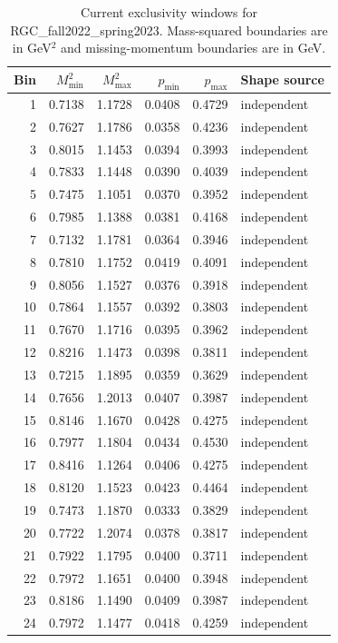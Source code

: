 \clearpage
\begin{longtable}{rrrrrl}
\caption{Current exclusivity windows for RGC\_fall2022\_spring2023. Mass-squared boundaries are in GeV$^2$ and missing-momentum boundaries are in GeV.}\\
\toprule Bin & $M^2_{\min}$ & $M^2_{\max}$ & $p_{\min}$ & $p_{\max}$ & Shape source\\\midrule\endhead
1 & 0.7138 & 1.1728 & 0.0408 & 0.4729 & independent\\
2 & 0.7627 & 1.1786 & 0.0358 & 0.4236 & independent\\
3 & 0.8015 & 1.1453 & 0.0394 & 0.3993 & independent\\
4 & 0.7833 & 1.1448 & 0.0390 & 0.4039 & independent\\
5 & 0.7475 & 1.1051 & 0.0370 & 0.3952 & independent\\
6 & 0.7985 & 1.1388 & 0.0381 & 0.4168 & independent\\
7 & 0.7132 & 1.1781 & 0.0364 & 0.3946 & independent\\
8 & 0.7810 & 1.1752 & 0.0419 & 0.4091 & independent\\
9 & 0.8056 & 1.1527 & 0.0376 & 0.3918 & independent\\
10 & 0.7864 & 1.1557 & 0.0392 & 0.3803 & independent\\
11 & 0.7670 & 1.1716 & 0.0395 & 0.3962 & independent\\
12 & 0.8216 & 1.1473 & 0.0398 & 0.3811 & independent\\
13 & 0.7215 & 1.1895 & 0.0359 & 0.3629 & independent\\
14 & 0.7656 & 1.2013 & 0.0407 & 0.3987 & independent\\
15 & 0.8146 & 1.1670 & 0.0428 & 0.4275 & independent\\
16 & 0.7977 & 1.1804 & 0.0434 & 0.4530 & independent\\
17 & 0.8416 & 1.1264 & 0.0406 & 0.4275 & independent\\
18 & 0.8120 & 1.1523 & 0.0423 & 0.4464 & independent\\
19 & 0.7473 & 1.1870 & 0.0333 & 0.3829 & independent\\
20 & 0.7722 & 1.2074 & 0.0378 & 0.3817 & independent\\
21 & 0.7922 & 1.1795 & 0.0400 & 0.3711 & independent\\
22 & 0.7972 & 1.1651 & 0.0400 & 0.3948 & independent\\
23 & 0.8186 & 1.1490 & 0.0409 & 0.3987 & independent\\
24 & 0.7972 & 1.1477 & 0.0418 & 0.4259 & independent\\
\bottomrule\end{longtable}
